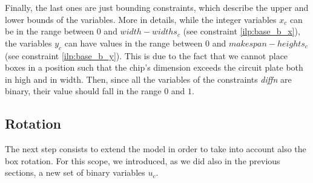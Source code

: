     Finally, the last ones are just bounding constraints, which describe the upper and lower bounds
    of the variables. More in details, while the integer variables \(x_c\) can be in the range 
    between \(0\) and \(width-widths_c\) (see constraint \ref{ilp:base_b_x}), the variables \(y_c\) 
    can have values in the range between \(0\) and \(makespan-heights_c\) (see constraint 
    \ref{ilp:base_b_y}). This is due to the fact that we cannot place boxes in a position such that 
    the chip's dimension exceeds the circuit plate both in high and in width. Then, since all the 
    variables of the constraints \textit{diffn} are binary, their value should fall in the range 
    \(0\) and \(1\).

\subsection{Rotation}
    The next step consists to extend the model in order to take into account also the box rotation.
    For this scope, we introduced, as we did also in the previous sections, a new set of binary 
    variables \(u_c\). 

